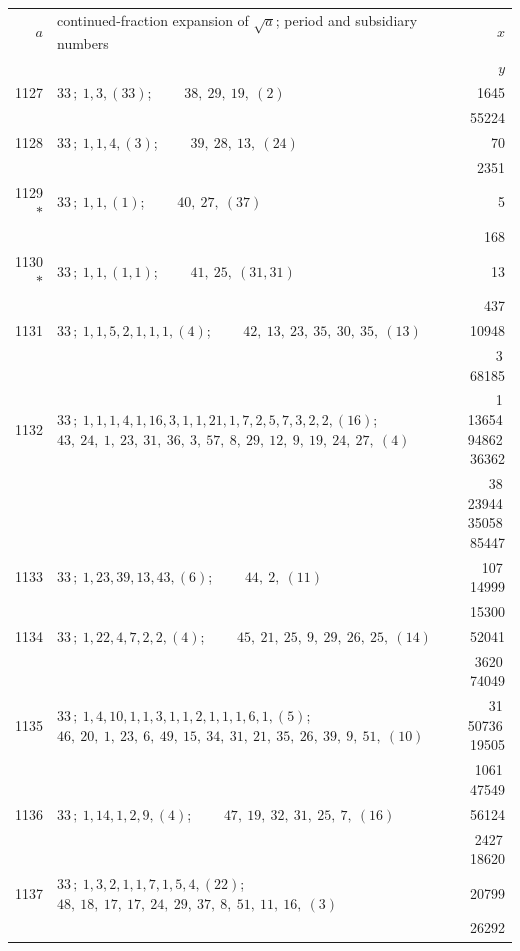 \documentclass[11pt]{article}
\providecommand{\asterism}{*}
\begin{document}
\renewcommand{\arraystretch}{1.15}
\begin{longtable}{|r|p{}|r|}
\hline
$a$ & continued-fraction expansion of $\sqrt{a}$; period and subsidiary numbers & $x$ \\
 & & $y$ \\
\hline
\endhead
1127 & $33\,;\ 1, 3, (33)$; \ \ \ \ $38,\ 29,\ 19,\ (2)$ & 1645 \\
 & & 55224 \\
\hline
1128 & $33\,;\ 1, 1, 4, (3)$; \ \ \ \ $39,\ 28,\ 13,\ (24)$ & 70 \\
 & & 2351 \\
\hline
1129$\asterism$ & $33\,;\ 1, 1, (1)$; \ \ \ \ $40,\ 27,\ (37)$ & 5 \\
 & & 168 \\
\hline
1130$\asterism$ & $33\,;\ 1, 1, (1, 1)$; \ \ \ \ $41,\ 25,\ (31, 31)$ & 13 \\
 & & 437 \\
\hline
1131 & $33\,;\ 1, 1, 5, 2, 1, 1, 1, (4)$; \ \ \ \ $42,\ 13,\ 23,\ 35,\ 30,\ 35,\ (13)$ & 10948 \\
 & & 3\,68185 \\
\hline
1132 & $33\,;\ 1, 1, 1, 4, 1, 16, 3, 1, 1, 21, 1, 7, 2, 5, 7, 3, 2, 2, (16)$; \ \ \ \ $43,\ 24,\ 1,\ 23,\ 31,\ 36,\ 3,\ 57,\ 8,\ 29,\ 12,\ 9,\ 19,\ 24,\ 27,\ (4)$ & 1\,13654\,94862\,36362 \\
 & & 38\,23944\,35058\,85447 \\
\hline
1133 & $33\,;\ 1, 23, 39, 13, 43, (6)$; \ \ \ \ $44,\ 2,\ (11)$ & 107\,14999 \\
 & & 15300 \\
\hline
1134 & $33\,;\ 1, 22, 4, 7, 2, 2, (4)$; \ \ \ \ $45,\ 21,\ 25,\ 9,\ 29,\ 26,\ 25,\ (14)$ & 52041 \\
 & & 3620\,74049 \\
\hline
1135 & $33\,;\ 1, 4, 10, 1, 1, 3, 1, 1, 2, 1, 1, 1, 6, 1, (5)$; \ \ \ \ $46,\ 20,\ 1,\ 23,\ 6,\ 49,\ 15,\ 34,\ 31,\ 21,\ 35,\ 26,\ 39,\ 9,\ 51,\ (10)$ & 31\,50736\,19505 \\
 & & 1061\,47549 \\
\hline
1136 & $33\,;\ 1, 14, 1, 2, 9, (4)$; \ \ \ \ $47,\ 19,\ 32,\ 31,\ 25,\ 7,\ (16)$ & 56124 \\
 & & 2427\,18620 \\
\hline
1137 & $33\,;\ 1, 3, 2, 1, 1, 7, 1, 5, 4, (22)$; \ \ \ \ $48,\ 18,\ 17,\ 17,\ 24,\ 29,\ 37,\ 8,\ 51,\ 11,\ 16,\ (3)$ & 20799 \\
 & & 26292 \\

\end{longtable}
\end{document}
